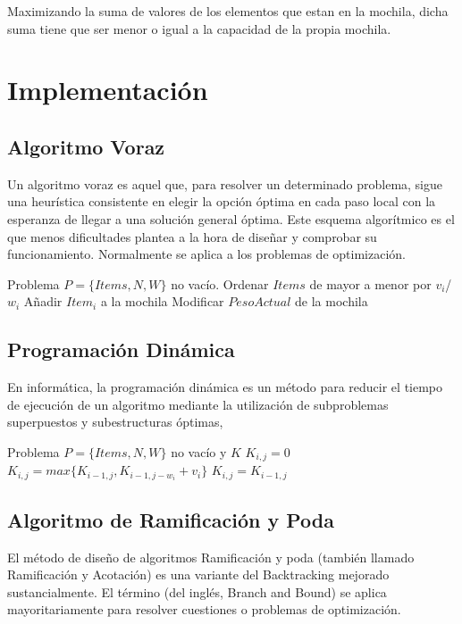\documentclass[preprint]{elsarticle}
\begin{document}
Maximizando la suma de valores de los elementos que estan en la mochila, dicha suma tiene que ser menor o igual a la capacidad de la propia mochila.

\section{Implementaci\'on}
\subsection{Algoritmo Voraz}
Un algoritmo voraz es aquel que, para resolver un determinado problema, sigue una heur\'istica consistente en elegir la opci\'on \'optima en cada paso local con la esperanza de llegar a una soluci\'on general \'optima. Este esquema algor\'itmico es el que menos dificultades plantea a la hora de diseñar y comprobar su funcionamiento. Normalmente se aplica a los problemas de optimizaci\'on.

\begin{algorithm}
\begin{algorithmic}[1]
\REQUIRE Problema $P = \{Items, N, W\}$ no vac\'io.
\STATE Ordenar $Items$ de mayor a menor por $v_i$/$w_i$
\STATE A\~nadir $Item_i$ a la mochila
\STATE Modificar $PesoActual$ de la mochila
\ENDWHILE
\end{algorithmic}
\end{algorithm}

\subsection{Programaci\'on Din\'amica}
En inform\'atica, la programaci\'on din\'amica es un m\'etodo para reducir el tiempo de ejecuci\'on de un algoritmo mediante la utilizaci\'on de subproblemas superpuestos y subestructuras \'optimas, 
\begin{algorithm}
\begin{algorithmic}[1]
\REQUIRE Problema $P = \{Items, N, W\}$ no vac\'io y $K$
      \STATE $K_{i,j}= 0$
      \STATE $K_{i,j} = max \{K_{i-1,j}, K_{i-1, j-w_i} + v_i\}$
    \ELSE
      \STATE $K_{i,j} = K_{i-1,j}$
    \ENDIF
  \ENDFOR
\ENDFOR
\end{algorithmic}
\end{algorithm}

\pagebreak

\subsection{Algoritmo de Ramificaci\'on y Poda}
El m\'etodo de dise\~no de algoritmos Ramificaci\'on y poda (tambi\'en llamado Ramificaci\'on y Acotaci\'on) es una variante del Backtracking mejorado sustancialmente. El t\'ermino (del ingl\'es, Branch and Bound) se aplica mayoritariamente para resolver cuestiones o problemas de optimizaci\'on.
\end{document}
